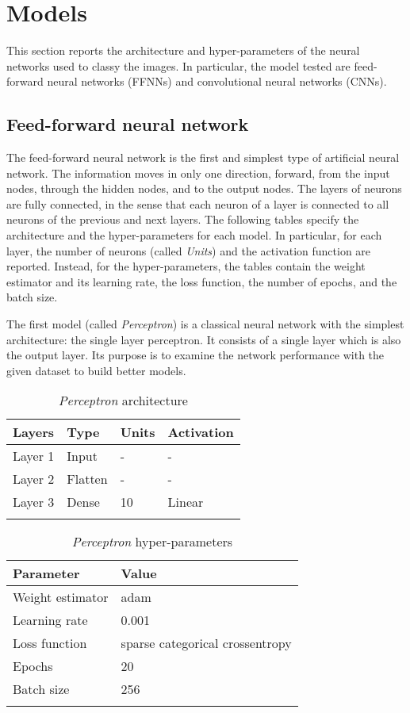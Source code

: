 \section{Models}\label{header-n90}

This section reports the architecture and hyper-parameters of the
neural networks used to classy the images. In particular, the model
tested are feed-forward neural networks (FFNNs) and convolutional neural
networks (CNNs).

\subsection{Feed-forward neural network}\label{header-n92}

The feed-forward neural network is the first and simplest type of
artificial neural network. The information moves in only one direction,
forward, from the input nodes, through the hidden nodes, and to the
output nodes. The layers of neurons are fully connected, in the sense
that each neuron of a layer is connected to all neurons of the previous
and next layers. The following tables specify the architecture and the
hyper-parameters for each model. In particular, for each layer, the
number of neurons (called \emph{Units}) and the activation function are
reported. Instead, for the hyper-parameters, the tables contain the
weight estimator and its learning rate, the loss function, the number of
epochs, and the batch size.

The first model (called \emph{Perceptron}) is a classical neural network
with the simplest architecture: the single layer perceptron. It consists
of a single layer which is also the output layer. Its purpose is to
examine the network performance with the given dataset to build better
models.

\begin{longtable}[]{@{}llll@{}}
	\toprule
	\textbf{Layers} & \textbf{Type} & \textbf{Units} & \textbf{Activation}\tabularnewline
	\midrule
	\endhead
	Layer 1 & Input & - & -\tabularnewline
	Layer 2 & Flatten & - & -\tabularnewline
	Layer 3 & Dense & 10 & Linear\tabularnewline
	\bottomrule
	\caption{\emph{Perceptron} architecture}
\end{longtable}

\begin{longtable}[]{@{}ll@{}}
	\toprule
	\textbf{Parameter} & \textbf{Value}\tabularnewline
	\midrule
	\endhead
	Weight estimator & adam\tabularnewline
	Learning rate & 0.001\tabularnewline
	Loss function & sparse categorical crossentropy\tabularnewline
	Epochs & 20\tabularnewline
	Batch size & 256\tabularnewline
	\bottomrule
	\caption{\emph{Perceptron} hyper-parameters}
\end{longtable}

